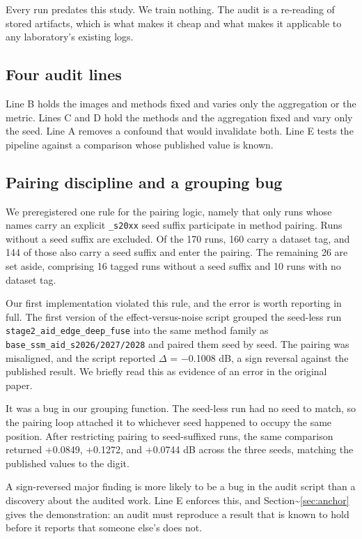 \documentclass{interact}
\begin{document}
Every run predates this study. We train nothing. The audit is a re-reading of stored artifacts, which is what makes it cheap and what makes it applicable to any laboratory's existing logs.

\subsection{Four audit lines}\label{sec:lines}

Line B holds the images and methods fixed and varies only the aggregation or the metric. Lines C and D hold the methods and the aggregation fixed and vary only the seed. Line A removes a confound that would invalidate both. Line E tests the pipeline against a comparison whose published value is known.

\subsection{Pairing discipline and a grouping bug}\label{sec:pairing}

We preregistered one rule for the pairing logic, namely that only runs whose names carry an explicit \texttt{\_\allowbreak s20xx} seed suffix participate in method pairing. Runs without a seed suffix are excluded. Of the 170 runs, 160 carry a dataset tag, and 144 of those also carry a seed suffix and enter the pairing. The remaining 26 are set aside, comprising 16 tagged runs without a seed suffix and 10 runs with no dataset tag.

Our first implementation violated this rule, and the error is worth reporting in full. The first version of the effect-versus-noise script grouped the seed-less run \texttt{stage2\_\allowbreak aid\_\allowbreak edge\_\allowbreak deep\_\allowbreak fuse} into the same method family as \texttt{base\_\allowbreak ssm\_\allowbreak aid\_\allowbreak s2026/2027/2028} and paired them seed by seed. The pairing was misaligned, and the script reported $\Delta$ = $-$0.1008 dB, a sign reversal against the published result. We briefly read this as evidence of an error in the original paper.

It was a bug in our grouping function. The seed-less run had no seed to match, so the pairing loop attached it to whichever seed happened to occupy the same position. After restricting pairing to seed-suffixed runs, the same comparison returned +0.0849, +0.1272, and +0.0744 dB across the three seeds, matching the published values to the digit.

A sign-reversed major finding is more likely to be a bug in the audit script than a discovery about the audited work. Line E enforces this, and Section\textasciitilde{}\ref{sec:anchor} gives the demonstration: an audit must reproduce a result that is known to hold before it reports that someone else's does not.
\end{document}
